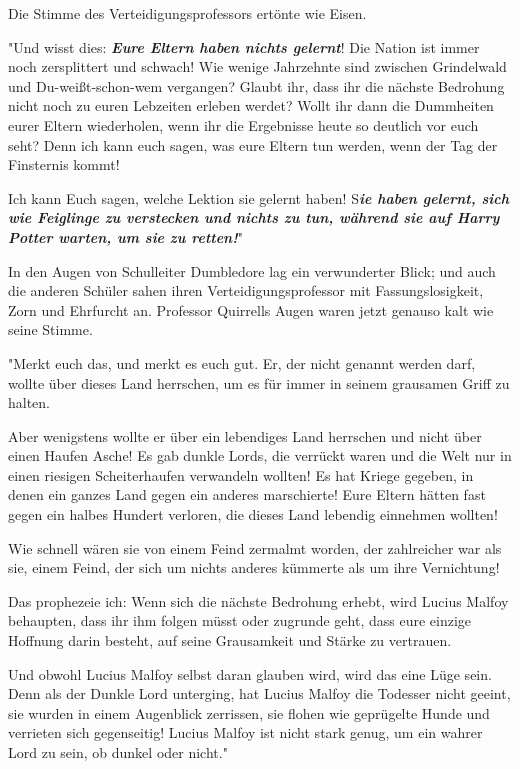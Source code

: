 {Die Stimme des Verteidigungsprofessors ertönte wie Eisen.

"Und wisst dies: \textbf{\emph{Eure Eltern haben nichts gelernt}}! Die Nation ist immer noch zersplittert und schwach! Wie wenige Jahrzehnte sind zwischen Grindelwald und Du-weißt-schon-wem vergangen? Glaubt ihr, dass ihr die nächste Bedrohung nicht noch zu euren Lebzeiten erleben werdet? Wollt ihr dann die Dummheiten eurer Eltern wiederholen, wenn ihr die Ergebnisse heute so deutlich vor euch seht? Denn ich kann euch sagen, was eure Eltern tun werden, wenn der Tag der Finsternis kommt!

Ich kann Euch sagen, welche Lektion sie gelernt haben! S\textbf{\emph{ie haben gelernt, sich wie Feiglinge zu verstecken und nichts zu tun, während sie auf Harry Potter warten, um sie zu retten!}}"

In den Augen von Schulleiter Dumbledore lag ein verwunderter Blick; und auch die anderen Schüler sahen ihren Verteidigungsprofessor mit Fassungslosigkeit, Zorn und Ehrfurcht an. Professor Quirrells Augen waren jetzt genauso kalt wie seine Stimme.

"Merkt euch das, und merkt es euch gut. Er, der nicht genannt werden darf, wollte über dieses Land herrschen, um es für immer in seinem grausamen Griff zu halten.

Aber wenigstens wollte er über ein lebendiges Land herrschen und nicht über einen Haufen Asche! Es gab dunkle Lords, die verrückt waren und die Welt nur in einen riesigen Scheiterhaufen verwandeln wollten! Es hat Kriege gegeben, in denen ein ganzes Land gegen ein anderes marschierte! Eure Eltern hätten fast gegen ein halbes Hundert verloren, die dieses Land lebendig einnehmen wollten!

Wie schnell wären sie von einem Feind zermalmt worden, der zahlreicher war als sie, einem Feind, der sich um nichts anderes kümmerte als um ihre Vernichtung!

Das prophezeie ich: Wenn sich die nächste Bedrohung erhebt, wird Lucius Malfoy behaupten, dass ihr ihm folgen müsst oder zugrunde geht, dass eure einzige Hoffnung darin besteht, auf seine Grausamkeit und Stärke zu vertrauen.

Und obwohl Lucius Malfoy selbst daran glauben wird, wird das eine Lüge sein. Denn als der Dunkle Lord unterging, hat Lucius Malfoy die Todesser nicht geeint, sie wurden in einem Augenblick zerrissen, sie flohen wie geprügelte Hunde und verrieten sich gegenseitig! Lucius Malfoy ist nicht stark genug, um ein wahrer Lord zu sein, ob dunkel oder nicht."

}
